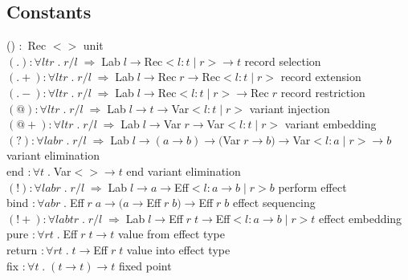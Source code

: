 \documentclass[12pt]{article}
\begin{document}
\subsection{Constants}
() $:$ Rec $<>$ \hspace{15pt} unit \\
$(.) : \forall l t r \; . \; r/l  \; \Rightarrow \; $Lab$ \; l \rightarrow $Rec$ < l : t \; | \; r > \rightarrow t $ \hspace{15pt} record selection \\
$(.{+}) : \forall l t r \; . \; r/l  \; \Rightarrow \; $Lab$ \; l \rightarrow $Rec$ \; r \rightarrow $Rec$ < l : t \; | \; r > $ \hspace{15pt} record extension \\
$(.-) : \forall l t r \; . \; r/l  \; \Rightarrow \; $Lab$ \; l \rightarrow $Rec$ <l : t \; | \; r > \rightarrow $Rec$ \; r $ \hspace{15pt} record restriction \\
$(@) : \forall l t r \; . \; r/l  \; \Rightarrow \; $Lab$ \; l \rightarrow t \rightarrow $Var$ <l : t \; | \; r >$ \hspace{15pt} variant injection \\
$(@{+}) : \forall l t r \; . \; r/l  \; \Rightarrow \; $Lab$ \; l \rightarrow $Var$ \; r \rightarrow $Var$ <l : t \; | \; r >$ \hspace{15pt} variant embedding \\
$(?) : \forall l a b r \; . \; r/l  \; \Rightarrow \; $Lab$ \; l \rightarrow ( a \rightarrow b ) \rightarrow ($Var$ \; r \rightarrow b) \rightarrow $Var$ <l : a \; | \; r> \rightarrow b$ \hspace{15pt} variant elimination \\
end $: \forall t \; . \; $Var$ <> \rightarrow t$ \hspace{15pt} end variant elimination \\
$(!) : \forall l a b r \; . \; r/l  \; \Rightarrow \; $Lab$ \; l \rightarrow a \rightarrow $Eff$ <l : a \rightarrow b \; | \; r > b$ \hspace{15pt} perform effect \\
bind $: \forall a b r \; . \; $Eff$ \; r \; a \rightarrow (a \rightarrow $Eff$ \; r \; b) \rightarrow $Eff$ \; r \; b $ \hspace{15pt} effect sequencing \\
$(!{+}) : \forall l a b t r \; . \; r/l  \; \Rightarrow \; $Lab$ \; l \rightarrow $Eff$ \; r \; t \rightarrow $Eff$ <l : a \rightarrow b \; | \; r > t$ \hspace{15pt} effect embedding \\
pure $: \forall rt \; . \; $Eff$ \; r \; t  \rightarrow t$ \hspace{15pt} value from effect type \\
return $: \forall rt \; . \; t \rightarrow $Eff$ \; r \; t$ \hspace{15pt} value into effect type \\
fix $: \forall t \; . \; (t \rightarrow t) \rightarrow t$ \hspace{15pt} fixed point \\
\end{document}
